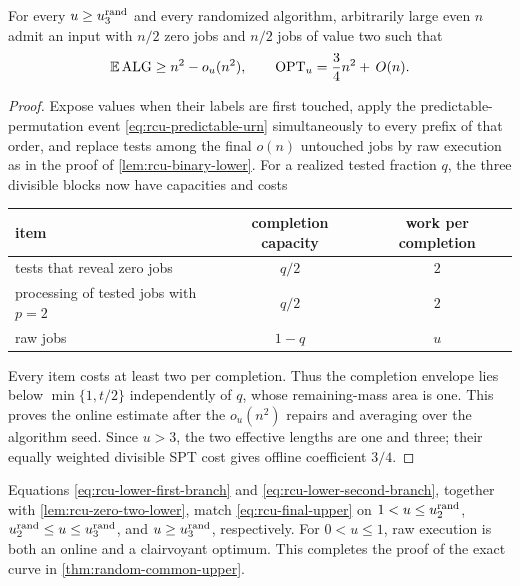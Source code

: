 \begin{lemma}
\label{lem:rcu-zero-two-lower}
For every $u\ge u_{3}^{\mathrm{rand}}$ and every randomized algorithm, arbitrarily large even
$n$ admit an input with $n/2$ zero jobs and $n/2$ jobs of value two such that
\begin{equation}
 \mathbb{E}\operatorname{ALG}\ge n^2-o_u(n^2),
 \qquad
 \operatorname{OPT}_u=\frac34n^2+\,O(n).
 \label{eq:rcu-zero-two-costs}
\end{equation}
\end{lemma}

\begin{proof}
Expose values when their labels are first touched, apply the
predictable-permutation event \cref{eq:rcu-predictable-urn} simultaneously
to every prefix of that order, and replace tests among the final $o(n)$
untouched jobs by raw execution as in the proof of
\cref{lem:rcu-binary-lower}.  For a realized tested fraction
$q$, the three divisible blocks now have capacities and costs
\begin{center}
\begin{tabular}{@{}lcc@{}}
\toprule
item & completion capacity & work per completion\\
\midrule
tests that reveal zero jobs & $q/2$ & $2$\\
processing of tested jobs with $p=2$ & $q/2$ & $2$\\
raw jobs & $1-q$ & $u$\\
\bottomrule
\end{tabular}
\end{center}
Every item costs at least two per completion.  Thus the completion envelope
lies below $\min\{1,t/2\}$ independently of $q$, whose remaining-mass area is
one.  This proves the online estimate after the $o_u(n^2)$ repairs and
averaging over the algorithm seed.  Since $u>3$, the two effective lengths
are one and three; their equally weighted divisible SPT cost gives offline
coefficient $3/4$.
\end{proof}

Equations \eqref{eq:rcu-lower-first-branch} and
\eqref{eq:rcu-lower-second-branch}, together with
\cref{lem:rcu-zero-two-lower}, match \eqref{eq:rcu-final-upper} on
$1<u\le u_{2}^{\mathrm{rand}}$, $u_{2}^{\mathrm{rand}}\le u\le u_{3}^{\mathrm{rand}}$, and
$u\ge u_{3}^{\mathrm{rand}}$, respectively.  For $0<u\le1$, raw execution is both an
online and a clairvoyant
optimum.  This completes the proof of the exact curve in
\cref{thm:random-common-upper}.

